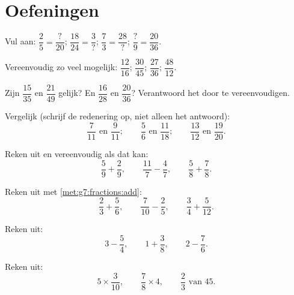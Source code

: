 \section{Oefeningen}

\begin{exercise}[$\star$]\label{exo:g7:fractions:1}
Vul aan: $\dfrac{2}{5} = \dfrac{?}{20}$; \quad
$\dfrac{18}{24} = \dfrac{3}{?}$; \quad
$\dfrac{7}{3} = \dfrac{28}{?}$; \quad
$\dfrac{?}{9} = \dfrac{20}{36}$.
\end{exercise}

\begin{exercise}[$\star$]\label{exo:g7:fractions:2}
Vereenvoudig zo veel mogelijk:
$\dfrac{12}{16}$; \quad $\dfrac{30}{45}$; \quad $\dfrac{27}{36}$;
\quad $\dfrac{48}{12}$.
\end{exercise}

\begin{exercise}[$\star$]\label{exo:g7:fractions:3}
Zijn $\dfrac{15}{35}$ en $\dfrac{21}{49}$ gelijk? En $\dfrac{16}{28}$ en
$\dfrac{20}{36}$? Verantwoord het door te vereenvoudigen.
\end{exercise}

\begin{exercise}[$\star$]\label{exo:g7:fractions:4}
Vergelijk (schrijf de redenering op, niet alleen het antwoord):
\[
\frac{7}{11} \text{ en } \frac{9}{11}; \qquad
\frac{5}{6} \text{ en } \frac{11}{18}; \qquad
\frac{13}{12} \text{ en } \frac{19}{20}.
\]
\end{exercise}

\begin{exercise}[$\star$]\label{exo:g7:fractions:5}
Reken uit en vereenvoudig als dat kan:
\[
\frac{5}{9} + \frac{2}{9}, \qquad
\frac{11}{7} - \frac{4}{7}, \qquad
\frac{5}{8} + \frac{7}{8} .
\]
\end{exercise}

\begin{exercise}[$\star$]\label{exo:g7:fractions:6}
Reken uit met \cref{met:g7:fractions:add}:
\[
\frac{2}{3} + \frac{5}{6}, \qquad
\frac{7}{10} - \frac{2}{5}, \qquad
\frac{3}{4} + \frac{5}{12} .
\]
\end{exercise}

\begin{exercise}[$\star$]\label{exo:g7:fractions:7}
Reken uit:
\[
3 - \frac{5}{4}, \qquad
1 + \frac{3}{8}, \qquad
2 - \frac{7}{6} .
\]
\end{exercise}

\begin{exercise}[$\star$]\label{exo:g7:fractions:8}
Reken uit:
\[
5 \times \frac{3}{10}, \qquad
\frac{7}{8} \times 4, \qquad
\frac{2}{3} \text{ van } 45 .
\]
\end{exercise}

